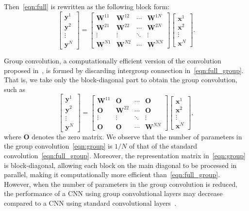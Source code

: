 \documentclass[preprint,12pt,authoryear]{elsarticle}
\numberwithin{equation}{section}
\theoremstyle{remark}
\newcommand\bO{\mathbf{O}}
\newcommand\bW{\mathbf{W}}
\newcommand\bx{\mathbf{x}}
\newcommand\by{\mathbf{y}}
\begin{document}
Then~\eqref{eqn:full} is rewritten as the following block form:
\begin{equation}
\label{eqn:full_group}
    \begin{bmatrix} \by^1 \\ \by^2 \\ \vdots \\ \by^N \end{bmatrix}
    = \begin{bmatrix} \bW^{11} & \bW^{12} & \cdots & \bW^{1N} \\
        \bW^{21} & \bW^{22} & \cdots & \bW^{2N} \\
        \vdots & \vdots & \ddots & \vdots \\
        \bW^{N1} & \bW^{N2} & \cdots & \bW^{NN} \end{bmatrix}
    \begin{bmatrix} \bx^1 \\ \bx^2 \\ \vdots \\ \bx^N \end{bmatrix}.
\end{equation}

Group convolution, a computationally efficient version of the convolution proposed in~\citep{krizhevsky2012imagenet}, is formed by discarding intergroup connection in~\eqref{eqn:full_group}.
That is, we take only the block-diagonal part to obtain the group convolution, such as
\begin{equation}
\label{eqn:group}
    \begin{bmatrix} \by^1 \\ \by^2 \\ \vdots \\ \by^N \end{bmatrix}
    = \begin{bmatrix} \bW^{11} & \bO & \cdots & \bO \\
        \bO & \bW^{22} & \cdots & \bO \\
        \vdots & \vdots & \ddots & \vdots \\
        \bO & \bO & \cdots & \bW^{NN} \end{bmatrix}
    \begin{bmatrix} \bx^1 \\ \bx^2 \\ \vdots \\ \bx^N \end{bmatrix},
\end{equation}
where $\bO$ denotes the zero matrix.
We observe that the number of parameters in the group convolution~\eqref{eqn:group} is $1/N$ of that of the standard convolution~\eqref{eqn:full_group}.
Moreover, the representation matrix in~\eqref{eqn:group} is block-diagonal, allowing each block on the main diagonal to be processed in parallel, making it computationally more efficient than~\eqref{eqn:full_group}. 
However, when the number of parameters in the group convolution is reduced, the performance of a CNN using group convolutional layers may decrease compared to a CNN using standard convolutional layers~\citep{lee2022two,zhang2018shufflenet}.
\end{document}
